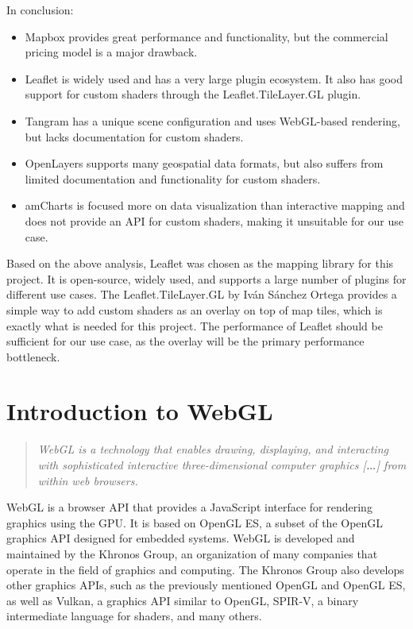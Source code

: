 In conclusion:
\begin{itemize}
    \item Mapbox provides great performance and functionality, but the commercial pricing model is a major drawback.
    \item Leaflet is widely used and has a very large plugin ecosystem. It also has good support for custom shaders through the Leaflet.TileLayer.GL plugin.
    \item Tangram has a unique scene configuration and uses WebGL-based rendering, but lacks documentation for custom shaders.
    \item OpenLayers supports many geospatial data formats, but also suffers from limited documentation and functionality for custom shaders.
    \item amCharts is focused more on data visualization than interactive mapping and does not provide an API for custom shaders, making it unsuitable for our use case.
\end{itemize}

Based on the above analysis, Leaflet was chosen as the mapping library for this project. It is open-source, widely used, and supports a large number of plugins for different use cases. The Leaflet.TileLayer.GL by Iván Sánchez Ortega provides a simple way to add custom shaders as an overlay on top of map tiles, which is exactly what is needed for this project. The performance of Leaflet should be sufficient for our use case, as the overlay will be the primary performance bottleneck.

\section{Introduction to WebGL}\label{sec:webgl}

\begin{quote}
    \textit{WebGL is a technology that enables drawing, displaying, and interacting with sophisticated
interactive three-dimensional computer graphics [$\ldotp\!\ldotp\!\ldotp$] from within web browsers.}\ \cite{webgl:book}
\end{quote}

WebGL is a browser API that provides a JavaScript interface for rendering graphics using the GPU\@. It is based on OpenGL ES, a subset of the OpenGL graphics API designed for embedded systems. WebGL is developed and maintained by the Khronos Group, an organization of many companies that operate in the field of graphics and computing. The Khronos Group also develops other graphics APIs, such as the previously mentioned OpenGL and OpenGL ES, as well as Vulkan, a graphics API similar to OpenGL, SPIR-V, a binary intermediate language for shaders, and many others.\ \cite{webgl:khronos}

